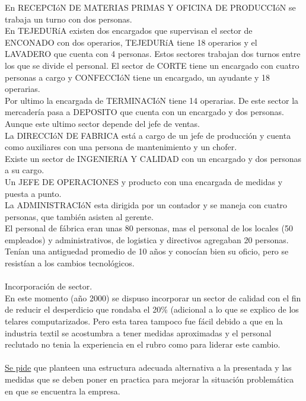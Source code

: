 \documentclass[a4paper,12pt,titlepage]{article}
\begin{document}
En RECEPCI\'{o}N DE MATERIAS PRIMAS Y OFICINA DE PRODUCCI\'{o}N se
trabaja un turno con dos personas.\\
En TEJEDUR\'{i}A existen dos encargados que supervisan el sector de ENCONADO
con dos operarios, TEJEDUR\'{i}A tiene 18 operarios y el LAVADERO que cuenta con
4 personas. Estos sectores trabajan dos turnos entre los que se divide el personal.
El sector de CORTE tiene un encargado con cuatro personas a cargo y
CONFECCI\'{o}N tiene un encargado, un ayudante y 18 operarias.\\
Por ultimo la encargada de TERMINACI\'{o}N tiene 14 operarias. De este sector la
mercader\'{i}a pasa a DEPOSITO que cuenta con un encargado y dos personas.
Aunque este ultimo sector depende del jefe de ventas.\\
La DIRECCI\'{o}N DE FABRICA est\'{a} a cargo de un jefe de producci\'{o}n y cuenta
como auxiliares con una persona de mantenimiento y un chofer.\\
Existe un sector de INGENIER\'{i}A Y CALIDAD con un encargado y dos personas a
su cargo.\\
Un JEFE DE OPERACIONES y producto con una encargada de medidas y puesta
a punto.\\
La ADMINISTRACI\'{o}N esta dirigida por un contador y se maneja con cuatro
personas, que tambi\'{e}n asisten al gerente.\\
El personal de f\'{a}brica eran unas 80 personas, mas el personal de los locales (50
empleados) y administrativos, de logistica y directivos agregaban 20 personas.
Ten\'{i}an una antiguedad promedio de 10 a\~nos y conoc\'{i}an bien su oficio, pero se
resist\'{i}an a los cambios tecnol\'{o}gicos.\\ \\
Incorporaci\'{o}n de sector.\\
En este momento (a\~no 2000) se dispuso incorporar un sector de calidad con el fin
de reducir el desperdicio que rondaba el 20\% (adicional a lo que se explico de los
telares computarizados. Pero esta tarea tampoco fue f\'{a}cil debido a que en la
industria textil se acostumbra a tener medidas aproximadas y el personal reclutado
no tenia la experiencia en el rubro como para liderar este cambio.\\ \\
\underline{Se pide} que planteen una estructura adecuada alternativa a la presentada y las
medidas que se deben poner en practica para mejorar la situaci\'{o}n problem\'{a}tica en
que se encuentra la empresa.
\end{document}

